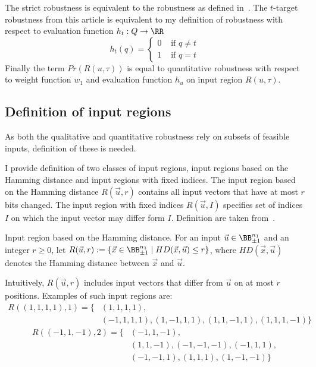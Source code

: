 The strict robustness is equivalent to the robustness as defined in~\cite{10.1145/3563212}.
The $t$-target robustness from this article is equivalent to my definition
of robustness with respect to evaluation function $h_t: Q\to \RR$
\begin{equation*}
    h_t(q) = \left\{\begin{matrix}
        0 & \text{ if } q \neq t\\
        1 & \text{ if } q = t
    \end{matrix}\right.
\end{equation*}
Finally the term $Pr(R(u, \tau))$ is equal to quantitative robustness  %
with respect to weight function $w_1$ and evaluation function $h_u$
on input region $R(u, \tau)$.


\subsection{Definition of input regions}

As both the qualitative and quantitative robustness rely on subsets
of feasible inputs, definition of these is needed.

I provide definition of two classes of input regions, input regions based
on the Hamming distance and input regions with fixed indices.
The input region based on the Hamming distance $R(\vec u, r)$ contains
all input vectors that have at most $r$ bits changed.
The input region with fixed indices $R(\vec u, I)$ specifies set of indices $I$
on which the input vector may differ form $I$.
Definition are taken from~\cite{zhang2021bdd4bnn}.

\begin{definition}{Input region based on the Hamming distance.}
    For an input $\vec u\in \BB^{n_1}_{\pm 1}$ and an integer $r \geq 0$, let
    $R(\vec u, r) := \{\vec x\in \BB^{n_1}_{\pm 1} \mid HD(\vec x, \vec u) \leq r \}$,
    where $HD(\vec x, \vec u)$ denotes the Hamming distance
    between $\vec x$ and $\vec u$.
\end{definition}

Intuitively, $R(\vec u, r)$ includes input vectors that differ from $\vec u$ on at most
$r$ positions. Examples of such input regions are:
\begin{align*}
    R((1, 1, 1, 1), 1) = \{&(1, 1, 1, 1),\\
    &(-1, 1, 1, 1), (1, -1, 1, 1), (1, 1, -1, 1), (1, 1, 1, -1)\}
\end{align*}
\begin{align*}
    R((-1, 1, -1), 2) = \{&(-1, 1, -1),\\
    &(1, 1, -1), (-1, -1, -1), (-1, 1, 1),\\
    &(-1, -1, 1), (1, 1, 1), (1, -1, -1)\}
\end{align*}

